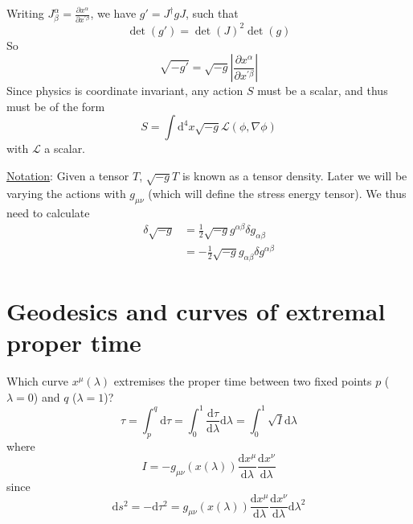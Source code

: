 \documentclass[a4paper]{book}
\theoremstyle{definition}
\theoremstyle{remark}
\begin{document}
Writing $J^\alpha_\beta = \frac{\partial x^\alpha}{\partial x^{'\beta}}$, we have $g' = J^\dagger g J$, such that 
\begin{equation}
    \det(g') = \det(J)^2 \det(g) 
\end{equation}
So 
\begin{equation}
    \sqrt{-g'} = \sqrt{-g}\left|\frac{\partial x^\alpha}{\partial x^{'\beta}}\right|
\end{equation}
Since physics is coordinate invariant, any action $S$ must be a scalar, and thus must be of the form 
\begin{equation}
    S = \int \text{d}^4 x \sqrt{-g}\mathcal{L}(\phi, \nabla \phi)
\end{equation}
with $\mathcal{L}$ a scalar. \par \medskip 

\underline{Notation}: Given a tensor $T$, $\sqrt{-g}T$ is known as a tensor density. Later we will be varying the actions with $g_{\mu\nu}$ (which will define the stress energy tensor). We thus need to calculate 
\begin{equation}
    \begin{aligned}
        \delta \sqrt{-g} &= \frac{1}{2}\sqrt{-g}g^{\alpha\beta}\delta g_{\alpha \beta} \\
        &= -\frac{1}{2}\sqrt{-g}g_{\alpha\beta}\delta g^{\alpha \beta}
    \end{aligned}
\end{equation}

\section{Geodesics and curves of extremal proper time}

Which curve $x^\mu(\lambda)$ extremises the proper time between two fixed points $p$ ($\lambda = 0$) and $q$ ($\lambda = 1$)? 
\begin{equation}
    \tau = \int_{p}^{q} \text{d}\tau = \int_{0}^{1}\frac{\text{d}\tau}{\text{d}\lambda} \text{d}\lambda = \int_{0}^{1}\sqrt{I}\text{d}\lambda 
\end{equation}
where 
\begin{equation}
    I = -g_{\mu\nu}(x(\lambda)) \frac{\text{d}x^\mu}{\text{d}\lambda}\frac{\text{d}x^\nu}{\text{d}\lambda}
\end{equation}
since 
\begin{equation}
    \text{d}s^2 = -\text{d}\tau^2 = g_{\mu\nu}(x(\lambda)) \frac{\text{d}x^\mu}{\text{d}\lambda}\frac{\text{d}x^\nu}{\text{d}\lambda} \text{d}\lambda^2
\end{equation}
\end{document}
